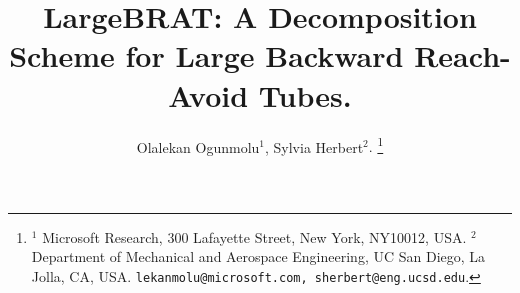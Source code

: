 \documentclass[letterpaper, 10 pt, journal, twoside]{IEEEtran}
\begin{document}

\title{LargeBRAT: A Decomposition Scheme for Large Backward  Reach-Avoid Tubes. 
}

\author{Olalekan Ogunmolu$^1$,  Sylvia Herbert$^2.$  
	\thanks{\footnotesize $^{1}$ Microsoft Research, 300 Lafayette Street, New York, NY10012, USA.  $^{2}$Department of Mechanical and Aerospace Engineering, UC San Diego, La Jolla, CA, USA.  {\tt\small lekanmolu@microsoft.com, sherbert@eng.ucsd.edu}. }
}

\maketitle







%



\appendix
\begin{appendices}
%	
	
%	
%	
\end{appendices}

%


	 	
%
\end{document}
